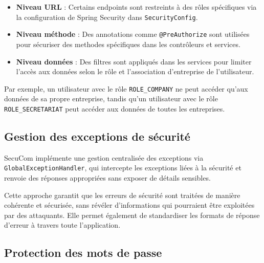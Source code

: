 \begin{itemize}[leftmargin=*,label=\textcolor{darkgray}{$\bullet$},itemsep=0.3em]
  \item \textbf{Niveau URL} : Certains endpoints sont restreints à des rôles spécifiques via la configuration de Spring Security dans \texttt{SecurityConfig}.
  \item \textbf{Niveau méthode} : Des annotations comme \texttt{@PreAuthorize} sont utilisées pour sécuriser des methodes spécifiques dans les contrôleurs et services.
  \item \textbf{Niveau données} : Des filtres sont appliqués dans les services pour limiter l'accès aux données selon le rôle et l'association d'entreprise de l'utilisateur.
\end{itemize}

\vspace{0.5cm}

\begin{note}
Par exemple, un utilisateur avec le rôle \texttt{ROLE\_COMPANY} ne peut accéder qu'aux données de sa propre entreprise, tandis qu'un utilisateur avec le rôle \texttt{ROLE\_SECRETARIAT} peut accéder aux données de toutes les entreprises.
\end{note}

\subsection{Gestion des exceptions de sécurité}

SecuCom implémente une gestion centralisée des exceptions via \texttt{GlobalExceptionHandler}, qui intercepte les exceptions liées à la sécurité et renvoie des réponses appropriées sans exposer de détails sensibles.

\vspace{0.5cm}

\begin{tcolorbox}[
  title={\textbf{Avantages de la gestion centralisée des exceptions}},
  colback=blue!5!white,
  colframe=primarycolor,
  fonttitle=\bfseries,
  boxrule=0.5mm,
  arc=2mm,
  left=6mm,
  right=6mm,
  top=6mm,
  bottom=6mm
]
Cette approche garantit que les erreurs de sécurité sont traitées de manière cohérente et sécurisée, sans révéler d'informations qui pourraient être exploitées par des attaquants. Elle permet également de standardiser les formats de réponse d'erreur à travers toute l'application.
\end{tcolorbox}

\subsection{Protection des mots de passe}

